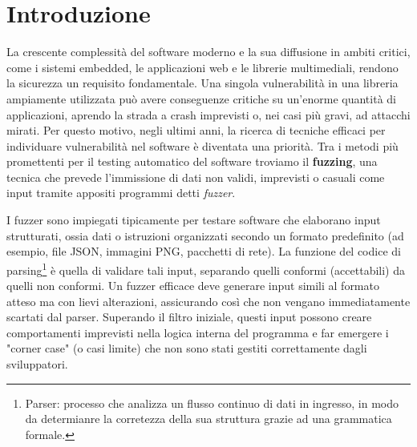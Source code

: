 \chapter{Introduzione}

La crescente complessità del software moderno e la sua diffusione in ambiti critici, come i sistemi embedded, le applicazioni web e le librerie multimediali, rendono la sicurezza un requisito fondamentale. Una singola vulnerabilità in una libreria ampiamente utilizzata può avere conseguenze critiche su un'enorme quantità di applicazioni, aprendo la strada a crash imprevisti o, nei casi più gravi, ad attacchi mirati. 
Per questo motivo, negli ultimi anni, la ricerca di tecniche efficaci per individuare vulnerabilità nel software è diventata una priorità.
Tra i metodi più promettenti per il testing automatico del software troviamo il {\bf fuzzing}, una tecnica che prevede l'immissione di dati non validi, imprevisti o casuali come input tramite appositi programmi detti {\it fuzzer}.



I fuzzer sono impiegati tipicamente per testare software che elaborano input strutturati, ossia dati o istruzioni organizzati secondo un formato predefinito (ad esempio, file JSON, immagini PNG, pacchetti di rete).
La funzione del codice di parsing\footnote{Parser: processo che analizza un flusso continuo di dati in ingresso, in modo da determianre la corretezza della sua struttura grazie ad una grammatica formale.} è quella di validare tali input, separando quelli conformi (accettabili) da quelli non conformi.
Un fuzzer efficace deve generare input simili al formato atteso ma con lievi alterazioni, assicurando così che non vengano immediatamente scartati dal parser. Superando il filtro iniziale, questi input possono creare comportamenti imprevisti nella logica interna del programma e far emergere i "corner case" (o casi limite) che non sono stati gestiti correttamente dagli sviluppatori.



